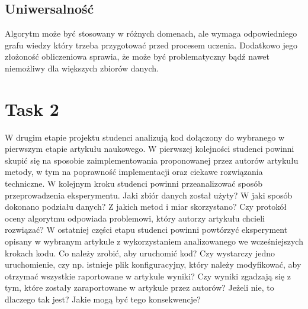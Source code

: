 \documentclass[a4paper]{LTJournalArticle}
\begin{document}
\subsection{Uniwersalność}
Algorytm może być stosowany w różnych domenach, ale wymaga odpowiedniego grafu wiedzy który trzeba przygotować przed procesem uczenia. Dodatkowo jego 
złożoność obliczeniowa sprawia, że może być problematyczny bądź nawet niemożliwy dla większych zbiorów danych.
	\section{Task 2}
	W drugim etapie projektu studenci analizują kod dołączony do wybranego
	w pierwszym etapie artykułu naukowego. W pierwszej kolejności studenci
	powinni skupić się na sposobie zaimplementowania proponowanej przez
	autorów artykułu metody, w tym na poprawność implementacji oraz ciekawe
	rozwiązania techniczne.
	W kolejnym kroku studenci powinni przeanalizować sposób
	przeprowadzenia eksperymentu. Jaki zbiór danych został użyty? W jaki sposób
	dokonano podziału danych? Z jakich metod i miar skorzystano? Czy protokół
	oceny algorytmu odpowiada problemowi, który autorzy artykułu chcieli
	rozwiązać?
	W ostatniej części etapu studenci powinni powtórzyć eksperyment opisany
	w wybranym artykule z wykorzystaniem analizowanego we wcześniejszych
	krokach kodu. Co należy zrobić, aby uruchomić kod? Czy wystarczy jedno
	uruchomienie, czy np. istnieje plik konfiguracyjny, który należy modyfikować,
	aby otrzymać wszystkie raportowane w artykule wyniki? Czy wyniki zgadzają się
	z tym, które zostały zaraportowane w artykule przez autorów? Jeżeli nie, to
	dlaczego tak jest? Jakie mogą być tego konsekwencje?
\end{document}
